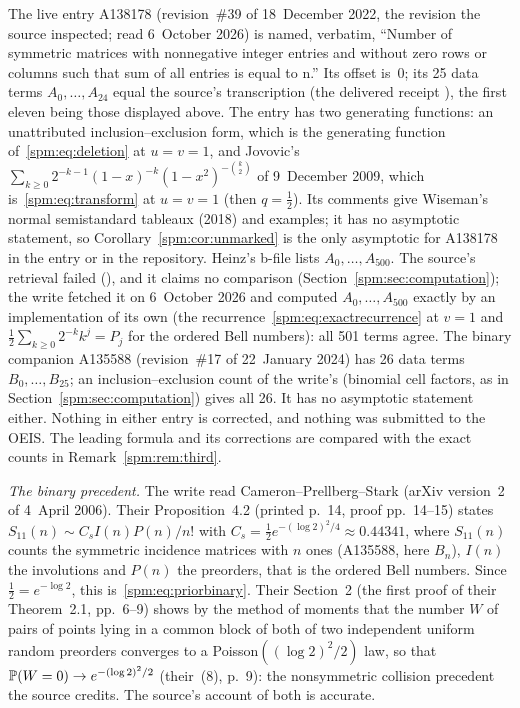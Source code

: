 \begin{remark}\label{spm:rem:oeis}
The live entry A138178 \cite{oeis138178} (revision~\#39 of 18~December
2022, the revision the source inspected; read 6~October 2026) is named,
verbatim, ``Number of symmetric matrices with nonnegative integer entries
and without zero rows or columns such that sum of all entries is equal to
n.'' Its offset is~$0$; its 25 data terms $A_0,\ldots,A_{24}$ equal the
source's transcription (the delivered receipt
), the first eleven being those displayed
above. The entry has two generating functions: an unattributed
inclusion--exclusion form, which is the generating function
of~\eqref{spm:eq:deletion} at $u=v=1$, and Jovovic's
$\sum_{k\ge0}2^{-k-1}(1-x)^{-k}(1-x^2)^{-\binom k2}$ of 9~December 2009,
which is~\eqref{spm:eq:transform} at $u=v=1$ (then $q=\tfrac12$). Its
comments give Wiseman's normal semistandard tableaux (2018) and
examples; it has no asymptotic statement, so Corollary~\ref{spm:cor:unmarked}
is the only asymptotic for A138178 in the entry or in the repository.
Heinz's b-file lists $A_0,\ldots,A_{500}$. The source's retrieval failed
(), and it claims no comparison
(Section~\ref{spm:sec:computation}); the write fetched it on
6~October 2026 and computed $A_0,\ldots,A_{500}$ exactly by an
implementation of its own (the recurrence~\eqref{spm:eq:exactrecurrence}
at $v=1$ and $\tfrac12\sum_{k\ge0}2^{-k}k^j=P_j$ for the ordered Bell
numbers): all 501 terms agree. The binary companion A135588
\cite{oeis135588} (revision~\#17 of 22~January 2024) has 26 data terms
$B_0,\ldots,B_{25}$; an inclusion--exclusion count of the write's
(binomial cell factors, as in Section~\ref{spm:sec:computation}) gives
all 26. It has no asymptotic statement either. Nothing in either entry is
corrected, and nothing was submitted to the OEIS. The leading formula and
its corrections are compared with the exact counts in
Remark~\ref{spm:rem:third}.

\emph{The binary precedent.} The write read Cameron--Prellberg--Stark
\cite{cps} (arXiv version~2 of 4~April 2006). Their
Proposition~4.2 (printed p.~14, proof pp.~14--15) states $S_{11}(n)\sim C_sI(n)P(n)/n!$ with
$C_s=\tfrac12e^{-(\log2)^2/4}\approx0.44341$, where $S_{11}(n)$ counts
the symmetric incidence matrices with $n$ ones (A135588, here $B_n$),
$I(n)$ the involutions and $P(n)$ the preorders, that is the ordered Bell
numbers. Since $\tfrac12=e^{-\log2}$, this is~\eqref{spm:eq:priorbinary}.
Their Section~2 (the first proof of their Theorem~2.1, pp.~6--9) shows by
the method of moments that the number $W$ of pairs of points lying in a
common block of both of two independent uniform random preorders converges
to a Poisson$((\log2)^2/2)$ law, so that $\mathbb P(W=0)\to e^{-(\log2)^2/2}$
(their~(8), p.~9):
the nonsymmetric collision precedent the source credits. The source's
account of both is accurate.
\end{remark}


